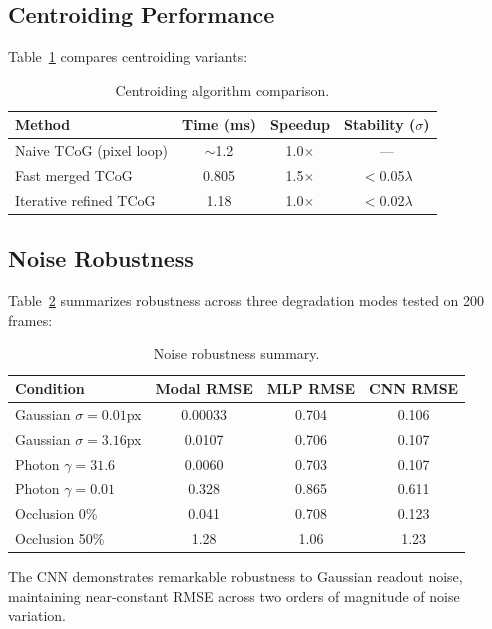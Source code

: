 \documentclass[twocolumn,10pt]{IEEEtran}
\begin{document}
\subsection{Centroiding Performance}
\label{sec:centroid-perf}

Table~\ref{tab:centroid} compares centroiding variants:

\begin{table}[H]
\centering
\caption{Centroiding algorithm comparison.}
\label{tab:centroid}
\small
\begin{tabular}{lccc}
\toprule
Method & Time (ms) & Speedup & Stability ($\sigma$) \\
\midrule
Naive TCoG (pixel loop) & $\sim$1.2 & 1.0$\times$ & — \\
Fast merged TCoG & 0.805 & 1.5$\times$ & $<$0.05$\lambda$ \\
Iterative refined TCoG & 1.18 & 1.0$\times$ & $<$0.02$\lambda$ \\
\bottomrule
\end{tabular}
\end{table}

\subsection{Noise Robustness}
\label{sec:noise}

Table~\ref{tab:noise} summarizes robustness across three degradation modes tested on 200 frames:

\begin{table}[H]
\centering
\caption{Noise robustness summary.}
\label{tab:noise}
\small
\begin{tabular}{lccc}
\toprule
Condition & Modal RMSE & MLP RMSE & CNN RMSE \\
\midrule
Gaussian $\sigma=0.01$px & 0.00033 & 0.704 & 0.106 \\
Gaussian $\sigma=3.16$px & 0.0107 & 0.706 & 0.107 \\
Photon $\gamma=31.6$ & 0.0060 & 0.703 & 0.107 \\
Photon $\gamma=0.01$ & 0.328 & 0.865 & 0.611 \\
Occlusion 0\% & 0.041 & 0.708 & 0.123 \\
Occlusion 50\% & 1.28 & 1.06 & 1.23 \\
\bottomrule
\end{tabular}
\end{table}

The CNN demonstrates remarkable robustness to Gaussian readout noise, maintaining near-constant RMSE across two orders of magnitude of noise variation.
\end{document}
